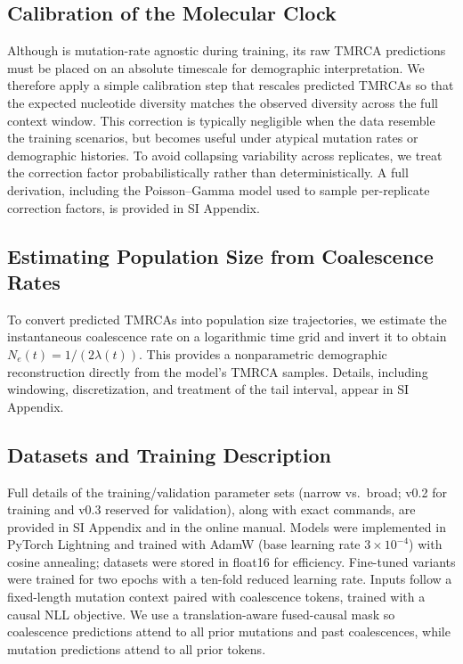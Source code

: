 \documentclass[9pt,twocolumn,twoside]{pnas-new}
\begin{document}
{\subsection*{Calibration of the Molecular Clock}
\label{correction}

Although \cxtkit is mutation-rate agnostic during training, 
its raw TMRCA predictions must be placed on an absolute timescale for demographic interpretation.
We therefore apply a simple calibration step that rescales predicted TMRCAs 
so that the expected nucleotide diversity matches 
the observed diversity across the full context window. 
This correction is typically negligible when the data resemble the training scenarios, 
but becomes useful under atypical mutation rates or demographic histories. 
To avoid collapsing variability across replicates, 
we treat the correction factor probabilistically rather than deterministically. 
A full derivation, including the Poisson–Gamma model used to sample per-replicate correction factors, 
is provided in SI Appendix.

\subsection*{Estimating Population Size from Coalescence Rates}

To convert predicted TMRCAs into population size trajectories, 
we estimate the instantaneous coalescence rate on a logarithmic time grid 
and invert it to obtain $N_e(t) = 1 / (2\lambda(t))$. 
This provides a nonparametric demographic reconstruction directly from the model's TMRCA samples. 
Details, including windowing, discretization, and treatment of the tail interval, 
appear in SI Appendix.


\subsection*{Datasets and Training Description}
\label{datasets}

Full details of the training/validation parameter sets (narrow vs.\ broad; \stdpopsim v0.2 for training and v0.3 reserved for validation), along with exact commands, are provided in SI Appendix and in the online manual. 
Models were implemented in PyTorch Lightning and trained with AdamW (base learning rate $3\times10^{-4}$) with cosine annealing; datasets were stored in float16 for efficiency. 
Fine-tuned variants were trained for two epochs with a ten-fold reduced learning rate. 
Inputs follow a fixed-length mutation context paired with coalescence tokens, trained with a causal NLL objective. 
We use a translation-aware fused-causal mask so coalescence predictions attend to all prior mutations and past coalescences, while mutation predictions attend to all prior tokens.


}
\end{document}
